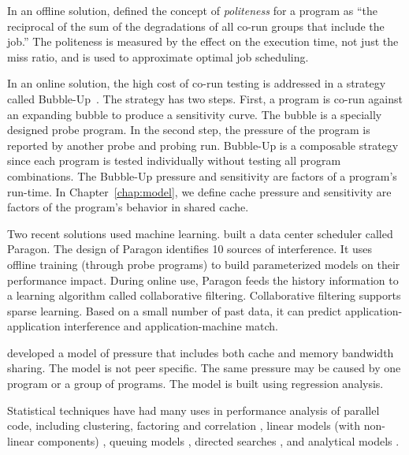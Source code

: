 
In an offline solution, \citet{Jiang+:TPDS11} defined the concept of
\emph{politeness} for a program as ``the reciprocal of the sum of the
degradations of all co-run groups that include the job.''  The
politeness is measured by the effect on the execution time, not just
the miss ratio, and is used to approximate optimal job scheduling.

In an online solution, the high cost of co-run testing is addressed in
a strategy called Bubble-Up~\citep{Mars+:IEEEM12}.  The strategy has
two steps.  First, a program is co-run against an expanding bubble to
produce a sensitivity curve.  The bubble is a specially designed probe
program.  In the second step, the pressure of the program is reported
by another probe and probing run.  Bubble-Up is a composable strategy
since each program is tested individually without testing all program
combinations.  The Bubble-Up pressure and sensitivity are factors of a
program's run-time.  In Chapter~\ref{chap:model}, we define cache
pressure and sensitivity are factors of the program's behavior in
shared cache. 


Two recent solutions used machine learning.
\citet{DelimitrouK:ASPLOS13} built a data center scheduler called
Paragon.  The design of Paragon identifies 10 sources of interference.
It uses offline training (through probe programs) to build
parameterized models on their performance impact.  During online use,
Paragon feeds the history information to a learning algorithm called
collaborative filtering.  Collaborative filtering supports sparse
learning.  Based on a small number of past data, it can predict
application-application interference and application-machine match.

\citet{Zhao+:PACT13} developed a model of pressure that includes both
cache and memory bandwidth sharing.  The model is not peer specific.
The same pressure may be caused by one program or a group of programs.
The model is built using regression analysis.  

Statistical techniques have had many uses in performance analysis of
parallel code, including clustering, factoring and correlation
\citep{AhnV:SC02}, linear models (with non-linear
components) \citep{Rodriguez+:EuroPar04}, queuing
models \citep{Jacquet+:IPDPS03}, directed
searches \citep{Miller+:Computer95}, and analytical models
\citep{Kerbyson+:IPS03}.


